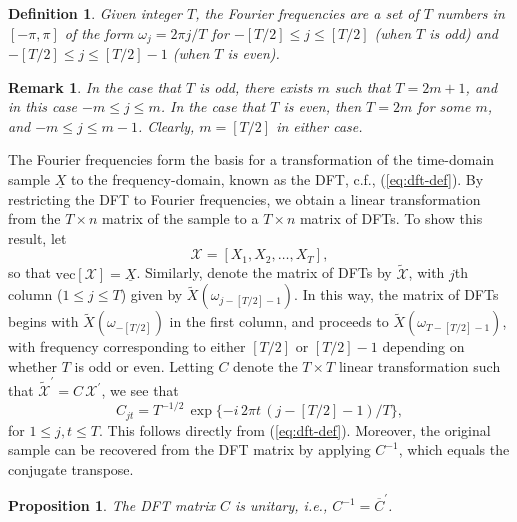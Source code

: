 \documentclass[a4paper]{book}
\newtheorem{Proposition}{Proposition}
\newtheorem{Definition}{Definition}
\newtheorem{Remark}{Remark}
\begin{document}
\begin{Definition} \rm
\label{def:fourier.freq}
 Given integer $T$, the Fourier frequencies are a set of $T$ numbers in $[-\pi,\pi]$
 of the form $\omega_{j} = 2 \pi j/ T $ for $-[T/2] \leq j \leq [T/2]$
 (when $T$ is odd) and $-[T/2] \leq j \leq [T/2]-1$ (when $T$ is even).
\end{Definition}

\begin{Remark} \rm
\label{rem:fourier.freq}
 In the case that $T$ is odd, there exists $m$ such that $T = 2 m + 1$, and in this
 case $-m \leq j \leq m$.  In the case that $T$ is even, then $T = 2m$ for some
 $m$, and $-m \leq j \leq m-1$.  Clearly, $m = [T/2]$ in either case.
\end{Remark}

The Fourier frequencies form the basis for a transformation of the time-domain
 sample $\underline{X}$ to the frequency-domain, known as the DFT, c.f., 
 (\ref{eq:dft-def}).  By restricting the DFT to Fourier frequencies, we obtain
 a linear transformation from the $T \times n$ matrix of the sample
 to a $T \times n$ matrix of DFTs.  To show this result, let 
\[
  \mathcal{X} = [ X_1, X_2, \ldots, X_T],
\]
 so that $\mbox{vec} [\mathcal{X}] = \underline{X}$.  Similarly, denote the matrix
 of DFTs by $\widetilde{\mathcal{X}}$, with $j$th column ($1 \leq j \leq T$) 
 given by $\widetilde{X} (\omega_{j - [T/2]-1})$.  In this way, the matrix of 
 DFTs begins with $\widetilde{X} (\omega_{-[T/2]})$ in the first column, and 
 proceeds to $\widetilde{X} (\omega_{T-[T/2]-1})$, with frequency corresponding
 to either $[T/2]$ or $[T/2] -1$ depending on whether $T$ is odd or even.
 Letting $C$ denote the $T \times T$ linear transformation such that
 $\widetilde{\mathcal{X}}^{\prime} = C \, \mathcal{X}^{\prime}$, we see that
\[
  C_{jt} = T^{-1/2} \, \exp \{ - i \, 2 \pi t \, (j- [T/2]-1)/T \},
\]
 for $1 \leq j,t \leq T$.  This follows directly from (\ref{eq:dft-def}).
 Moreover, the original sample can be recovered from the DFT matrix by applying
 $C^{-1}$, which equals the conjugate transpose.

\begin{Proposition}
 \label{prop:dft-unitary}
  The DFT matrix $C$ is unitary, i.e., $C^{-1} = \overline{C}^{\prime}$.
\end{Proposition}
\end{document}
